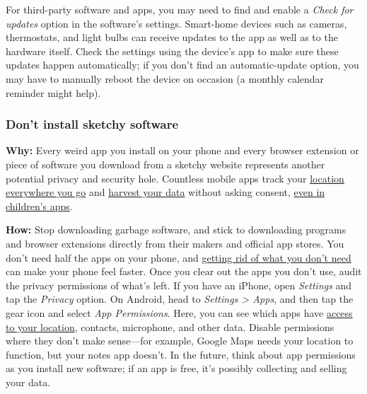 For third-party software and apps, you may need to find and enable a
\emph{Check for updates} option in the software's settings. Smart-home
devices such as cameras, thermostats, and light bulbs can receive
updates to the app as well as to the hardware itself. Check the settings
using the device's app to make sure these updates happen automatically;
if you don't find an automatic-update option, you may have to manually
reboot the device on occasion (a monthly calendar reminder might help).

\hypertarget{dont-install-sketchy-software}{%
\subsubsection{Don't install sketchy
software}\label{dont-install-sketchy-software}}

\textbf{Why:} Every weird app you install on your phone and every
browser extension or piece of software you download from a sketchy
website represents another potential privacy and security hole.
Countless mobile apps track your
\href{https://www.nytimes.com/interactive/2018/12/10/business/location-data-privacy-apps.html}{location
everywhere you go} and
\href{https://www.nytimes.com/2018/05/19/technology/phone-apps-stalking.html}{harvest
your data} without asking consent,
\href{https://www.nytimes.com/interactive/2018/09/12/technology/kids-apps-data-privacy-google-twitter.html}{even
in children's apps}.~

\textbf{How:} Stop downloading garbage software, and stick to
downloading programs and browser extensions directly from their makers
and official app stores. You don't need half the apps on your phone, and
\href{https://www.nytimes.com/2019/04/18/smarter-living/wirecutter/declutter-speed-up-phone.html}{getting
rid of what you don't need} can make your phone feel faster. Once you
clear out the apps you don't use, audit the privacy permissions of
what's left. If you have an iPhone, open \emph{Settings} and tap the
\emph{Privacy} option. On Android, head to \emph{Settings \textgreater{}
Apps}, and then tap the gear icon and select \emph{App Permissions}.
Here, you can see which apps have
\href{https://www.nytimes.com/2018/12/10/technology/prevent-location-data-sharing.html}{access
to your location}, contacts, microphone, and other data. Disable
permissions where they don't make sense---for example, Google Maps needs
your location to function, but your notes app doesn't. In the future,
think about app permissions as you install new software; if an app is
free, it's possibly collecting and selling your data.

